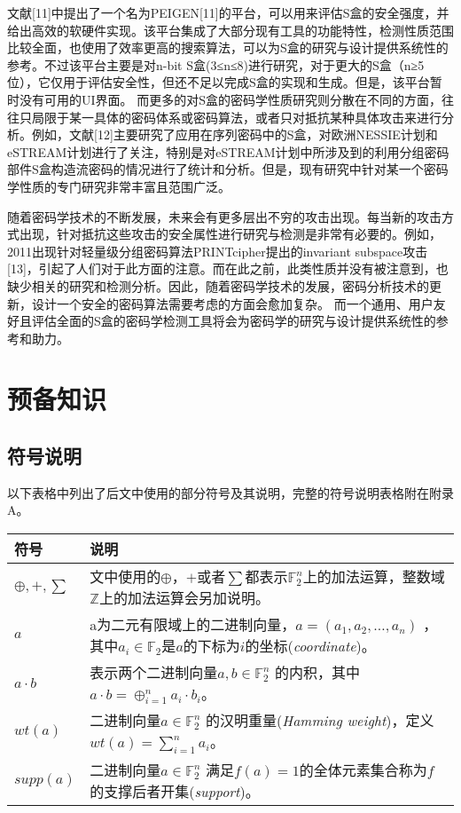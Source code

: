 \documentclass{xduugthesis}
\numberwithin{equation}{section}
\begin{document}
文献[11]中提出了一个名为PEIGEN[11]的平台，可以用来评估S盒的安全强度，并给出高效的软硬件实现。该平台集成了大部分现有工具的功能特性，检测性质范围比较全面，也使用了效率更高的搜索算法，可以为S盒的研究与设计提供系统性的参考。不过该平台主要是对n-bit S盒(3≤n≤8)进行研究，对于更大的S盒（n≥5位），它仅用于评估安全性，但还不足以完成S盒的实现和生成。但是，该平台暂时没有可用的UI界面。
而更多的对S盒的密码学性质研究则分散在不同的方面，往往只局限于某一具体的密码体系或密码算法，或者只对抵抗某种具体攻击来进行分析。例如，文献[12]主要研究了应用在序列密码中的S盒，对欧洲NESSIE计划和eSTREAM计划进行了关注，特别是对eSTREAM计划中所涉及到的利用分组密码部件S盒构造流密码的情况进行了统计和分析。但是，现有研究中针对某一个密码学性质的专门研究非常丰富且范围广泛。\par

随着密码学技术的不断发展，未来会有更多层出不穷的攻击出现。每当新的攻击方式出现，针对抵抗这些攻击的安全属性进行研究与检测是非常有必要的。例如，2011出现针对轻量级分组密码算法PRINTcipher提出的invariant subspace攻击[13]，引起了人们对于此方面的注意。而在此之前，此类性质并没有被注意到，也缺少相关的研究和检测分析。因此，随着密码学技术的发展，密码分析技术的更新，设计一个安全的密码算法需要考虑的方面会愈加复杂。
而一个通用、用户友好且评估全面的S盒的密码学检测工具将会为密码学的研究与设计提供系统性的参考和助力。


\chapter{预备知识}
\section{符号说明}
以下表格中列出了后文中使用的部分符号及其说明，完整的符号说明表格附在附录A。\par
\begin{tabular}{|p{3cm}|p{11cm}|}
\hline
符号& 说明\\
\hline
$\oplus,+,\sum $ & 文中使用的$\oplus$，$+$或者$\sum$都表示$\mathbb{F}_2^n$上的加法运算，整数域$\mathbb{Z}$上的加法运算会另加说明。\\
\hline
$a$ & a为二元有限域上的二进制向量，$a=(a_1,a_2,\dots ,a_n)$ ，其中$a_i \in \mathbb{F}_2$是$a$的下标为$i$的坐标(\emph{coordinate})。\\
\hline
$a \cdot b$ & 表示两个二进制向量$a,b \in \mathbb{F}_2^n$ 的内积，其中$a \cdot b = \oplus _{i=1}^n a_i \cdot b_i$。\\
\hline
$wt(a)$ & 二进制向量$a \in \mathbb{F}_2^n$ 的汉明重量(\emph{Hamming weight})，定义$wt(a)=\sum_{i=1}^n a_i $。\\
\hline
$supp(a)$ & 二进制向量$a\in \mathbb{F}_2^n$ 满足$f(a)=1$的全体元素集合称为$f$的支撑后者开集(\emph{support})。\\
\hline
\end{tabular}\par
\end{document}
